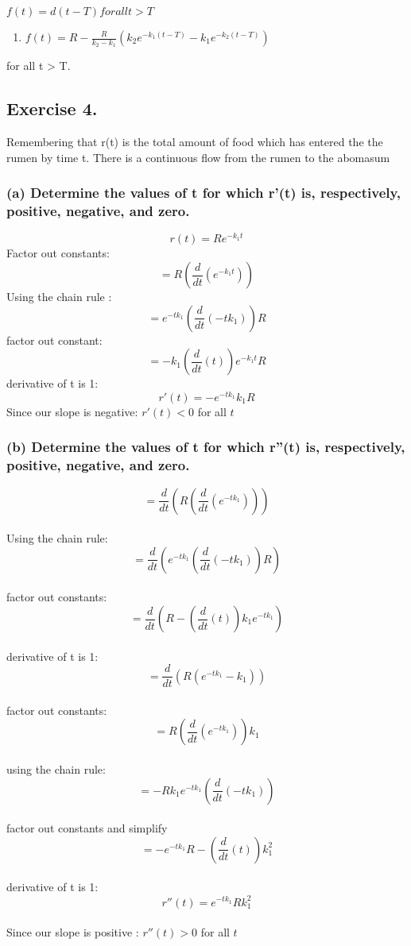 \documentclass[]{article}
\providecommand{\tightlist}{%
  \setlength{\itemsep}{0pt}\setlength{\parskip}{0pt}}
\begin{document}
\(f(t) = d(t-T) for all t > T\)

\begin{enumerate}
\def\labelenumi{(\arabic{enumi})}
\setcounter{enumi}{9}
\tightlist
\item
  \(f(t) = R - \frac{R}{k_2-k_1}(k_2e^{-k_1(t-T)}-k_1e^{-k_2(t-T)})\)
\end{enumerate}

for all t \textgreater{} T.

\subsection{Exercise 4.}\label{exercise-4.}

Remembering that r(t) is the total amount of food which has entered the
the rumen by time t. There is a continuous flow from the rumen to the
abomasum

\subsubsection{(a) Determine the values of t for which r'(t) is,
respectively, positive, negative, and
zero.}\label{a-determine-the-values-of-t-for-which-rt-is-respectively-positive-negative-and-zero.}

\[r(t) = Re^{-k_1t}\] Factor out constants:
\[=R(\frac{d}{dt}(e^{-k_1 t}))\] Using the chain rule :
\[= e^{-tk_1}(\frac{d}{dt}(-tk_1))R\] factor out constant:
\[=-k_1 (\frac{d}{dt}(t))e^{-k_1 t}R\] derivative of t is 1:
\[r'(t)= -e^{-tk_1}k_1R\] Since our slope is negative: \(r'(t) < 0\) for
all \(t\)

\subsubsection{(b) Determine the values of t for which r''(t) is,
respectively, positive, negative, and
zero.}\label{b-determine-the-values-of-t-for-which-rt-is-respectively-positive-negative-and-zero.}

\[= \frac{d}{dt}(R(\frac{d}{dt}(e^{-tk_1})))\]\\
Using the chain rule:
\[= \frac{d}{dt}(e^{-tk_1}(\frac{d}{dt}(-tk_1))R)\]\\
factor out constants:
\[= \frac{d}{dt}(R -(\frac{d}{dt}(t))k_1 e^{-tk_1})\]\\
derivative of t is 1: \[= \frac{d}{dt}(R(e^{-tk_1}-k_1))\]\\
factor out constants: \[= R(\frac{d}{dt}(e^{-tk_1}))k_1\]\\
using the chain rule: \[= -Rk_1e^{-tk_1}(\frac{d}{dt}(-tk_1))\]\\
factor out constants and simplify
\[= -e^{-tk_1}R-(\frac{d}{dt}(t))k_1^2\]\\
derivative of t is 1: \[r''(t)= e^{-tk_1}Rk_1^2\]\\
Since our slope is positive : \(r''(t) > 0\) for all \(t\)
\end{document}
